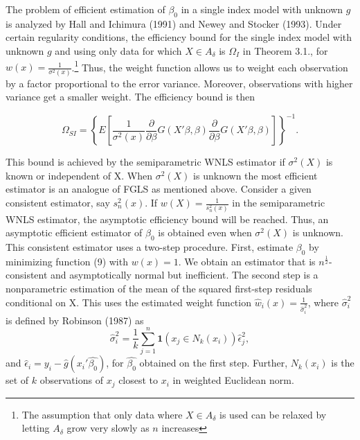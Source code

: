 \documentclass[a4paper]{article}
\begin{document}




The problem of efficient estimation of $\beta_0$ in a single index model with unknown $g$ is analyzed by Hall and Ichimura (1991) and Newey and Stocker (1993). Under certain regularity conditions, the efficiency bound for the single index model with unknown $g$ and using only data for which $X \in A_{\delta}$ is $\Omega_I$ in Theorem 3.1., for $w(x) = \frac{1}{\sigma^2(x)}$.\footnote{The assumption that only data where  $X \in A_{\delta}$ is used can be relaxed by letting $A_\delta$ grow very slowly as $n$ increases} Thus, the weight function allows us to weight each observation by a factor proportional to the error variance. Moreover, observations with higher variance get a smaller weight. The efficiency bound is then

\begin{equation}
\Omega_{SI} = \left\{ E\left[\frac{1}{\sigma^2(x)}\frac{\partial}{\partial \beta}
 G(X'\beta,\beta)\frac{\partial}{\partial \beta} G(X'\beta,\beta) \right] \right\}^{-1}.
\end{equation}


This bound is achieved by the semiparametric WNLS estimator if $\sigma^2(X)$ is known or independent of X. When $\sigma^2(X)$ is unknown the most efficient estimator is an analogue of FGLS as mentioned above.  Consider a given consistent estimator, say $s_{n}^{2}(x)$. If $w(X) = \frac{1}{s_{n}^{2}(x)}$ in the semiparametric WNLS estimator, the asymptotic efficiency bound will be reached. Thus, an asymptotic efficient estimator of $\beta_0$ is obtained even when $\sigma^2(X)$ is unknown. This consistent estimator uses a two-step procedure. First, estimate $\beta_0$ by minimizing function (9) with $w(x) = 1$. We obtain an estimator that is $n^{\frac{1}{2}}$-consistent and asymptotically normal but inefficient. The second step is a nonparametric estimation of the mean of the squared first-step residuals conditional on X. This uses the estimated weight function $\hat{w}_i(x) = \frac{1}{\hat{\sigma}_{i}^{2}}$, where  $\hat{\sigma}_{i}^{2}$ is defined by Robinson (1987) as 
\[\hat{\sigma}_{i}^{2} = \frac{1}{k}\sum_{j=1}^{n} \mathbf{1}{(x_j \in N_k(x_i))}\hat{\epsilon}_{j}^{2} ,\]
and $\hat{\epsilon}_i = y_i - \hat{g}(x_i'\hat{\beta_0})$, for $\hat{\beta_0}$ obtained on the first step. Further, $N_k(x_i)$ is the set of $k$ observations of $x_j$ closest to $x_i$ in weighted Euclidean norm.
\end{document}
